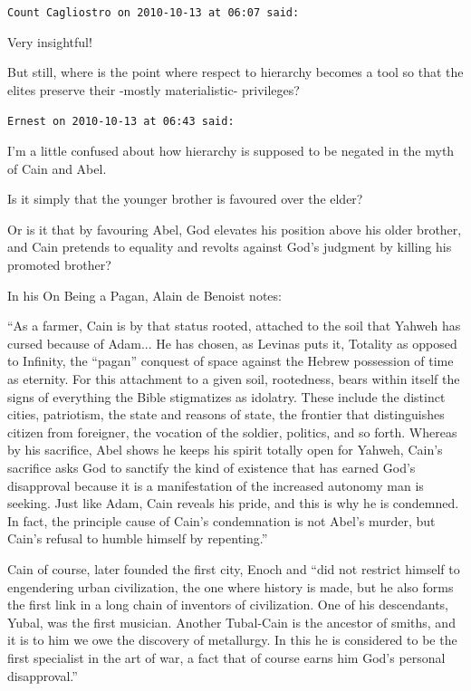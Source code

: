 \begin{footnotesize}
\begin{sffamily}
\texttt{Count Cagliostro on 2010-10-13 at 06:07 said:}

Very insightful!

But still, where is the point where respect to hierarchy becomes a tool so that the elites preserve their -mostly materialistic- privileges?

\hfill

\texttt{Ernest on 2010-10-13 at 06:43 said:}

I'm a little confused about how hierarchy is supposed to be negated in the myth of Cain and Abel.

Is it simply that the younger brother is favoured over the elder?

Or is it that by favouring Abel, God elevates his position above his older brother, and Cain pretends to equality and revolts against God's judgment by killing his promoted brother?

In his On Being a Pagan, Alain de Benoist notes:

``As a farmer, Cain is by that status rooted, attached to the soil that Yahweh has cursed because of Adam... He has chosen, as Levinas puts it, Totality as opposed to Infinity, the ``pagan'' conquest of space against the Hebrew possession of time as eternity. For this attachment to a given soil, rootedness, bears within itself the signs of everything the Bible stigmatizes as idolatry. These include the distinct cities, patriotism, the state and reasons of state, the frontier that distinguishes citizen from foreigner, the vocation of the soldier, politics, and so forth. Whereas by his sacrifice, Abel shows he keeps his spirit totally open for Yahweh, Cain's sacrifice asks God to sanctify the kind of existence that has earned God's disapproval because it is a manifestation of the increased autonomy man is seeking. Just like Adam, Cain reveals his pride, and this is why he is condemned. In fact, the principle cause of Cain's condemnation is not Abel's murder, but Cain's refusal to humble himself by repenting.''

Cain of course, later founded the first city, Enoch and ``did not restrict himself to engendering urban civilization, the one where history is made, but he also forms the first link in a long chain of inventors of civilization. One of his descendants, Yubal, was the first musician. Another Tubal-Cain is the ancestor of smiths, and it is to him we owe the discovery of metallurgy. In this he is considered to be the first specialist in the art of war, a fact that of course earns him God's personal disapproval.''


\end{sffamily}
\end{footnotesize}
